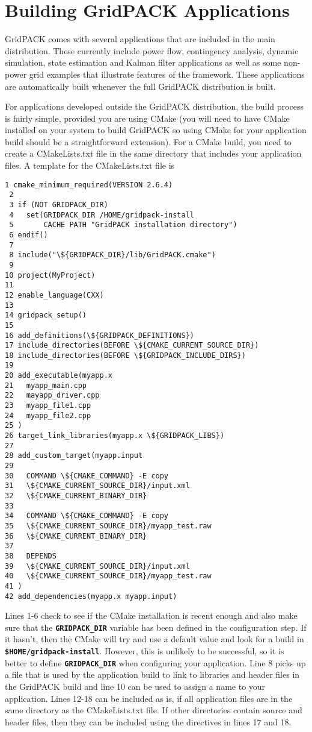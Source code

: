\chapter{Building GridPACK Applications}

GridPACK comes with several applications that are included in the main distribution. These currently include power flow, contingency analysis, dynamic simulation, state estimation and Kalman filter applications as well as some non-power grid examples that illustrate features of the framework. These applications are automatically built whenever the full GridPACK distribution is built. 

For applications developed outside the GridPACK distribution, the build process is fairly simple, provided you are using CMake (you will need to have CMake installed on your system to build GridPACK so using CMake for your application build should be a straightforward extension). For a CMake build, you need to create a CMakeLists.txt file in the same directory that includes your application files. A template for the CMakeLists.txt file is

{
\color{red}
\begin{Verbatim}[fontseries=b]
 1 cmake_minimum_required(VERSION 2.6.4)
 2
 3 if (NOT GRIDPACK_DIR)
 4   set(GRIDPACK_DIR /HOME/gridpack-install
 5       CACHE PATH "GridPACK installation directory")
 6 endif()
 7
 8 include("\${GRIDPACK_DIR}/lib/GridPACK.cmake")
 9
10 project(MyProject)
11
12 enable_language(CXX)
13
14 gridpack_setup()
15
16 add_definitions(\${GRIDPACK_DEFINITIONS})
17 include_directories(BEFORE \${CMAKE_CURRENT_SOURCE_DIR})
18 include_directories(BEFORE \${GRIDPACK_INCLUDE_DIRS})
19
20 add_executable(myapp.x
21   myapp_main.cpp
22   mayapp_driver.cpp
23   myapp_file1.cpp
24   myapp_file2.cpp
25 )
26 target_link_libraries(myapp.x \${GRIDPACK_LIBS})
27 
28 add_custom_target(myapp.input
29 
30   COMMAND \${CMAKE_COMMAND} -E copy 
31   \${CMAKE_CURRENT_SOURCE_DIR}/input.xml
32   \${CMAKE_CURRENT_BINARY_DIR}
33 
34   COMMAND \${CMAKE_COMMAND} -E copy 
35   \${CMAKE_CURRENT_SOURCE_DIR}/myapp_test.raw
36   \${CMAKE_CURRENT_BINARY_DIR}
37 
38   DEPENDS 
39   \${CMAKE_CURRENT_SOURCE_DIR}/input.xml
40   \${CMAKE_CURRENT_SOURCE_DIR}/myapp_test.raw
41 )
42 add_dependencies(myapp.x myapp.input)
\end{Verbatim}
}

Lines 1-6 check to see if the CMake installation is recent enough and also make sure that the \texttt{\textbf{GRIDPACK\_DIR}} variable has been defined in the configuration step. If it hasn't, then the CMake will try and use a default value and look for a build in\texttt{\textbf{ \$HOME/gridpack-install}}. However, this is unlikely to be successful, so it is better to define \texttt{\textbf{GRIDPACK\_DIR}} when configuring your application. Line 8 picks up a file that is used by the application build to link to libraries and header files in the GridPACK build and line 10 can be used to assign a name to your application. Lines 12-18 can be included as is, if all application files are in the same directory as the CMakeLists.txt file. If other directories contain source and header files, then they can be included using the directives in lines 17 and 18.

